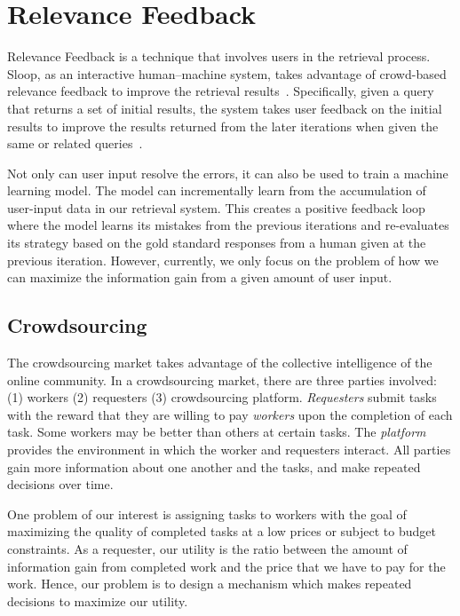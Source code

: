\section{Relevance Feedback}

Relevance Feedback is a technique that involves users in the retrieval process.
Sloop, as an interactive human–machine system, takes advantage of crowd-based
relevance feedback to improve the retrieval results~\cite{sloop15}.
Specifically, given a query that returns a set of initial results, the system
takes user feedback on the initial results to improve the results returned from
the later iterations when given the same or related
queries~\cite{manning2008introduction}.

Not only can user input resolve the errors, it can also be used to train a
machine learning model. The model can incrementally learn from the accumulation
of user-input data in our retrieval system. This creates a positive feedback
loop where the model learns its mistakes from the previous iterations and
re-evaluates its strategy based on the gold standard responses from a human
given at the previous iteration. However, currently, we only focus on the
problem of how we can maximize the information gain from a given amount of user
input.

\subsection{Crowdsourcing}

The crowdsourcing market takes advantage of the collective intelligence of the
online community. In a crowdsourcing market, there are three parties involved:
(1) workers (2) requesters (3) crowdsourcing platform.  \emph{Requesters} submit
tasks with the reward that they are willing to pay \emph{workers} upon the
completion of each task. Some workers may be better than others at certain
tasks. The \emph{platform} provides the environment in which the worker and
requesters interact. All parties gain more information about one another and the
tasks, and make repeated decisions over time.

One problem of our interest is assigning tasks to workers with the goal of
maximizing the quality of completed tasks at a low prices or subject to budget
constraints. As a requester, our utility is the ratio between the amount of
information gain from completed work and the price that we have to pay for the
work. Hence, our problem is to design a mechanism which makes repeated decisions
to maximize our utility.

